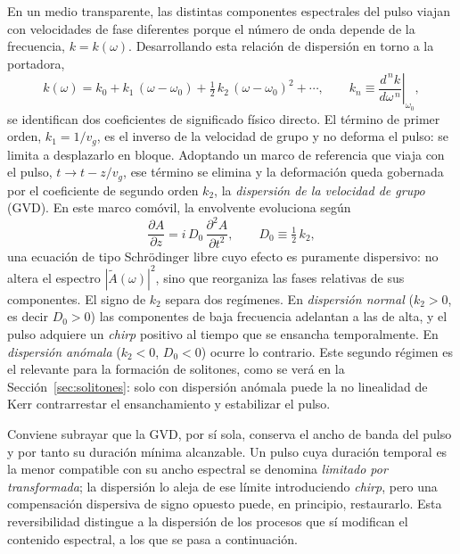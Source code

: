 En un medio transparente, las distintas componentes espectrales del pulso viajan
con velocidades de fase diferentes porque el número de onda depende de la
frecuencia, $k=k(\omega)$. Desarrollando esta relación de dispersión en torno a la
portadora,
%
\begin{equation}
    k(\omega) = k_0 + k_1\,(\omega-\omega_0)
    + \tfrac{1}{2}\,k_2\,(\omega-\omega_0)^2 + \cdots,
    \qquad
    k_n \equiv \left.\frac{d^{\,n}k}{d\omega^{\,n}}\right|_{\omega_0},
    \label{eq:beta_expansion}
\end{equation}
%
se identifican dos coeficientes de significado físico directo. El término de
primer orden, $k_1 = 1/v_g$, es el inverso de la velocidad de grupo y no deforma
el pulso: se limita a desplazarlo en bloque. Adoptando un marco de referencia que
viaja con el pulso, $t \to t - z/v_g$, ese término se elimina y la deformación
queda gobernada por el coeficiente de segundo orden $k_2$, la \emph{dispersión de
la velocidad de grupo} (GVD). En este marco comóvil, la envolvente evoluciona
según
%
\begin{equation}
    \frac{\partial A}{\partial z}
    = i\,D_0\,\frac{\partial^2 A}{\partial t^2},
    \qquad D_0 \equiv \tfrac{1}{2}\,k_2,
    \label{eq:gvd_prop}
\end{equation}
%
una ecuación de tipo Schrödinger libre cuyo efecto es puramente dispersivo: no
altera el espectro $|\tilde A(\omega)|^2$, sino que reorganiza las fases
relativas de sus componentes. El signo de $k_2$ separa dos regímenes. En
\emph{dispersión normal} ($k_2>0$, es decir $D_0>0$) las componentes de baja
frecuencia adelantan a las de alta, y el pulso adquiere un \emph{chirp} positivo
al tiempo que se ensancha temporalmente. En \emph{dispersión anómala}
($k_2<0$, $D_0<0$) ocurre lo contrario. Este segundo régimen es el relevante para
la formación de solitones, como se verá en la Sección~\ref{sec:solitones}: solo
con dispersión anómala puede la no linealidad de Kerr contrarrestar el
ensanchamiento y estabilizar el pulso.

Conviene subrayar que la GVD, por sí sola, conserva el ancho de banda del pulso y
por tanto su duración mínima alcanzable. Un pulso cuya duración temporal es la
menor compatible con su ancho espectral se denomina \emph{limitado por
transformada}; la dispersión lo aleja de ese límite introduciendo \emph{chirp},
pero una compensación dispersiva de signo opuesto puede, en principio,
restaurarlo. Esta reversibilidad distingue a la dispersión de los procesos que sí
modifican el contenido espectral, a los que se pasa a continuación.

